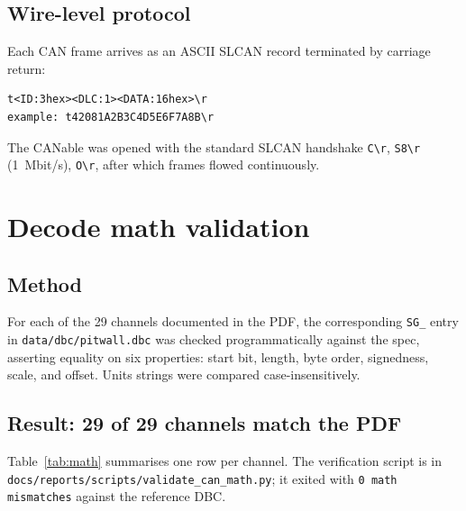 \documentclass[11pt,a4paper]{article}
\begin{document}
\subsection{Wire-level protocol}

Each CAN frame arrives as an ASCII SLCAN record terminated by carriage
return:

\begin{lstlisting}
t<ID:3hex><DLC:1><DATA:16hex>\r
example: t42081A2B3C4D5E6F7A8B\r
\end{lstlisting}

The CANable was opened with the standard SLCAN handshake
\texttt{C\textbackslash r}, \texttt{S8\textbackslash r} (\SI{1}{Mbit/s}),
\texttt{O\textbackslash r}, after which frames flowed continuously.

\section{Decode math validation}

\subsection{Method}

For each of the 29 channels documented in the PDF, the corresponding
\texttt{SG\_} entry in \texttt{data/dbc/pitwall.dbc} was checked
programmatically against the spec, asserting equality on six
properties: start bit, length, byte order, signedness, scale, and
offset. Units strings were compared case-insensitively.

\subsection{Result: 29 of 29 channels match the PDF}

Table~\ref{tab:math} summarises one row per channel. The verification
script is in \texttt{docs/reports/scripts/validate\_can\_math.py}; it
exited with \texttt{0 math mismatches} against the reference DBC.
\end{document}
